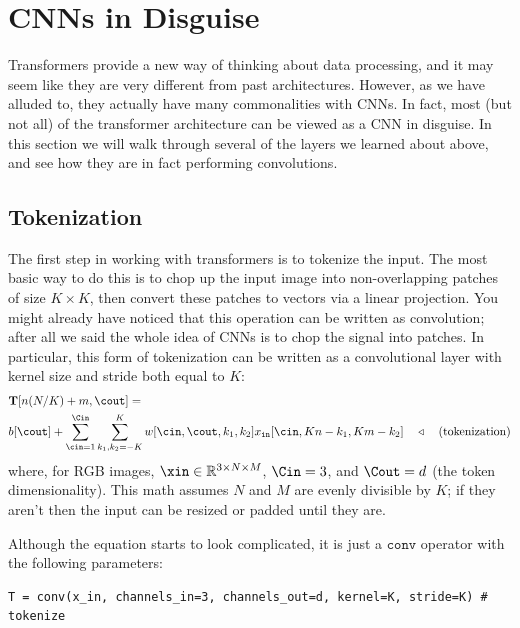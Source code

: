 \section{CNNs in Disguise}

Transformers provide a new way of thinking about data processing, and it may seem like they are very different from past architectures. However, as we have alluded to, they actually have many commonalities with CNNs. In fact, most (but not all) of the transformer architecture can be viewed as a CNN in disguise. In this section we will walk through several of the layers we learned about above, and see how they are in fact performing convolutions.

\subsection{Tokenization}

The first step in working with transformers is to tokenize the input. The most basic way to do this is to chop up the input image into non-overlapping patches of size $K \times K$, then convert these patches to vectors via a linear projection. You might already have noticed that this operation can be written as convolution; after all we said the whole idea of CNNs is to chop the signal into patches. In particular, this form of tokenization can be written as a convolutional layer with kernel size and stride both equal to $K$:
\begin{align}
     & \mathbf{T}[n(N/K)+m,\cout] = \nonumber                                                                                                                                                                         \\
     & b[\cout] +  \sum_{\cin=1}^{\Cin} \sum_{k_1,k_2=-K}^K w[\cin,\cout,k_1,k_2] x_{\texttt{in}}[\cin,K n-k_1,K m-k_2] \quad \triangleleft \quad \text{(tokenization)} \label{eqn:transformers:tokenization_as_conv}
\end{align}
where, for RGB images, $\xin \in \mathbb{R}^{3 \times N \times M}$, $\Cin=3$, and $\Cout=d$ (the token dimensionality). This math assumes $N$ and $M$ are evenly divisible by $K$; if they aren't then the input can be resized or padded until they are.

Although the equation starts to look complicated, it is just a $\texttt{conv}$ operator with the following parameters:
\begin{verbatim}
T = conv(x_in, channels_in=3, channels_out=d, kernel=K, stride=K) # tokenize
\end{verbatim}

